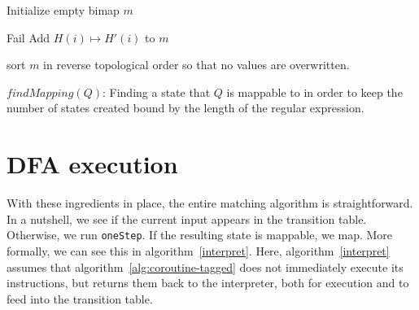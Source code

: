 \documentclass[11pt,a4paper,twoside,openright]{Thesis}
\theoremstyle{definition}
\begin{document}
\begin{algorithm*}[htpb]
\begin{algorithmic}[1]
    

	\State Initialize empty bimap $m$ 
	
    
			
				\State Fail
			\Else
				\State Add $H(i) \mapsto H'(i)$ to $m$
			\EndIf
		\EndFor
    \EndFor
\EndFor
{}
  
	\State sort $m$ in reverse topological order so that no values are overwritten.
  
  \caption[$findMapping(Q)$]{\label{findmapping}$findMapping(Q)$: Finding a state that $Q$ is
mappable to in order to keep the number of states created bound by the length
of the regular expression.}
\end{algorithmic}
\end{algorithm*}

\section{DFA execution}
With these ingredients in place, the entire matching algorithm is
straightforward.  In a nutshell, we see if the current input appears
in the transition table. Otherwise, we run \texttt{oneStep}. If the
resulting state is mappable, we map.  More formally, we can see
this in algorithm~\ref{interpret}. Here, algorithm~\ref{interpret} 
assumes that algorithm~\ref{alg:coroutine-tagged} does not immediately execute 
its instructions, but returns them back to the interpreter, both for 
execution and to feed into the transition table.
\end{document}

